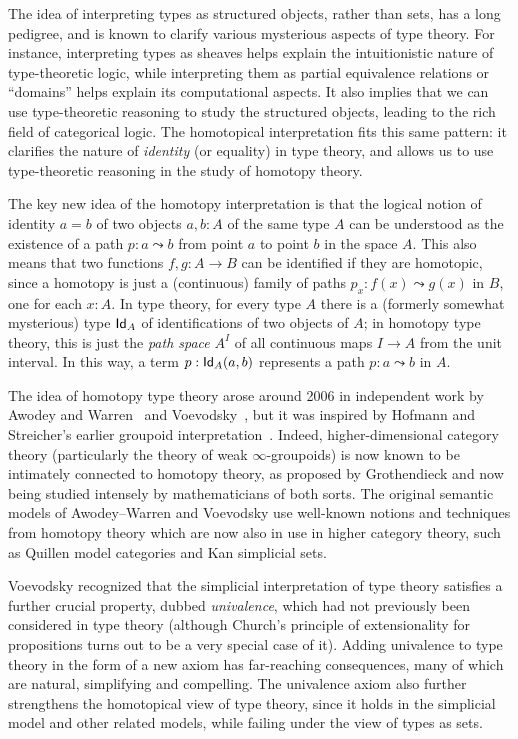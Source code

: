 The idea of interpreting types as structured objects, rather than sets, has a long pedigree, and is known to clarify various mysterious aspects of type theory.
For instance, interpreting types as sheaves helps explain the intuitionistic nature of type-theoretic logic, while interpreting them as partial equivalence relations or ``domains'' helps explain its computational aspects.
It also implies that we can use type-theoretic reasoning to study the structured objects, leading to the rich field of categorical logic.
The homotopical interpretation fits this same pattern: it clarifies the nature of \emph{identity} (or equality) in type theory, and allows us to use type-theoretic reasoning in the study of homotopy theory.

The key new idea of the homotopy interpretation is that the logical notion of identity $a = b$ of two objects $a, b: A$ of the same type $A$ can be understood as the existence of a path $p : a \leadsto b$ from point $a$ to point $b$ in the space $A$.
This also means that two functions $f, g: A\to B$ can be identified if they are homotopic, since a homotopy is just a (continuous) family of paths $p_x: f(x) \leadsto g(x)$ in $B$, one for each $x:A$.
In type theory, for every type $A$ there is a (formerly somewhat mysterious) type $\idtypevar{A}$ of identifications of two objects of $A$; in homotopy type theory, this is just the \emph{path space} $A^I$ of all continuous maps $I\to A$ from the unit interval.
%
%
%
%
In this way, a term $p : \idtype[A]{a}{b}$ represents a path $p : a \leadsto b$ in $A$. 

The idea of homotopy type theory arose around 2006 in independent work by Awodey and Warren~\cite{AW} and Voevodsky~\cite{VV}, but it was inspired by 
Hofmann and Streicher's earlier groupoid interpretation~\cite{hs:gpd-typethy}.
Indeed, higher-dimensional category theory (particularly the theory of weak $\infty$-groupoids) is now known to be intimately connected to homotopy theory, as proposed by Grothendieck and now being studied intensely by mathematicians of both sorts.
The original semantic models of Awodey--Warren and Voevodsky use well-known notions and techniques from homotopy theory which are now also in use in higher category theory, such as  Quillen model categories and Kan simplicial sets.
%
%

Voevodsky recognized that the simplicial interpretation of type theory satisfies a further crucial property, dubbed \emph{univalence}, which had not previously been considered in type theory (although Church's principle of extensionality for propositions turns out to be a very special case of it).
Adding univalence to type theory in the form of a new axiom has far-reaching consequences, many of which are natural, simplifying and compelling.
The univalence axiom also further strengthens the homotopical view of type theory, since it holds in the simplicial model and other related models, while failing under the view of types as sets.

